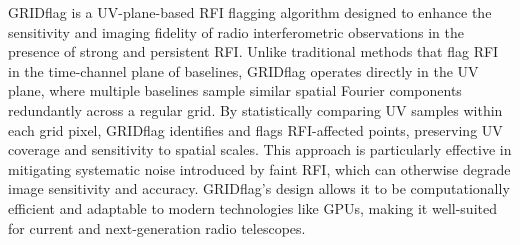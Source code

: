GRIDflag \cite{10464448} is a UV-plane-based RFI flagging algorithm designed to enhance the sensitivity and imaging fidelity of radio interferometric observations in the presence of strong and persistent RFI. Unlike traditional methods that flag RFI in the time-channel plane of baselines, GRIDflag operates directly in the UV plane, where multiple baselines sample similar spatial Fourier components redundantly across a regular grid. By statistically comparing UV samples within each grid pixel, GRIDflag identifies and flags RFI-affected points, preserving UV coverage and sensitivity to spatial scales. This approach is particularly effective in mitigating systematic noise introduced by faint RFI, which can otherwise degrade image sensitivity and accuracy. GRIDflag's design allows it to be computationally efficient and adaptable to modern technologies like GPUs, making it well-suited for current and next-generation radio telescopes.

